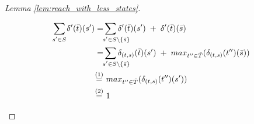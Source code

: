 \documentclass{llncs}
\newcommand{\ssum}[2]{\sum\limits_{\mathclap{#1}^{#2}}}%
\begin{document}
\begin{proof}[Lemma \ref{lem:reach_with_less_states}]
\begin{enumerate}
\begin{enumerate}
	\par\noindent
	\begin{align*}
		\ssum{s^\prime \in S}{} \delta^\prime(\bar{t})(s^\prime)
		=
		&
		\ssum{\hspace{0.5cm}s^\prime \in S \setminus \{\bar{s}\}}{} \delta^\prime(\bar{t})(s^\prime)
		\hspace{0.1cm} + \hspace{0.1cm} 
		\delta^\prime(\bar{t})(\bar{s})
\\
		= &
		\ssum{\hspace{0.5cm}s^\prime \in S \setminus \{\bar{s}\}}{} \delta_{(t,s)}(\bar{t})(s^\prime)
		\hspace{0.1cm} + \hspace{0.1cm} 
		max_{t^{\prime\prime} \in \bar{T}}(\delta_{(t,s)}(t^{\prime\prime})(\bar{s}))
\\
		\stackrel{(1)}{=} &~
		max_{t^{\prime\prime} \in \bar{T}}(\delta_{(t,s)}(t^{\prime\prime})(s^\prime))
\\
		\stackrel{(2)}{=} &~
		1
	\end{align*}
			

\end{enumerate}
\end{enumerate}
\end{proof}
\end{document}
